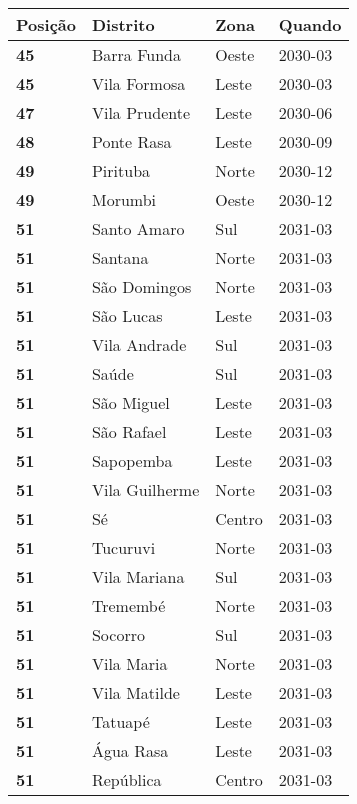 \begin{table}[H]
	\centering
	\begin{tabular}{l|l|l|l}
		\textbf{Posição} & \textbf{Distrito} & \textbf{Zona} & \textbf{Quando} \\ \hline
		\textbf{45} & Barra Funda & Oeste & 2030-03\\ \hline
		\textbf{45} & Vila Formosa & Leste & 2030-03\\ \hline
		\textbf{47} & Vila Prudente & Leste & 2030-06\\ \hline
		\textbf{48} & Ponte Rasa & Leste & 2030-09\\ \hline
		\textbf{49} & Pirituba & Norte & 2030-12\\ \hline
		\textbf{49} & Morumbi & Oeste & 2030-12\\ \hline
		\textbf{51} & Santo Amaro & Sul & 2031-03\\ \hline
		\textbf{51} & Santana & Norte & 2031-03\\ \hline
		\textbf{51} & São Domingos & Norte & 2031-03\\ \hline
		\textbf{51} & São Lucas & Leste & 2031-03\\ \hline
		\textbf{51} & Vila Andrade & Sul & 2031-03\\ \hline
		\textbf{51} & Saúde & Sul & 2031-03\\ \hline
		\textbf{51} & São Miguel & Leste & 2031-03\\ \hline
		\textbf{51} & São Rafael & Leste & 2031-03\\ \hline
		\textbf{51} & Sapopemba & Leste & 2031-03\\ \hline
		\textbf{51} & Vila Guilherme & Norte & 2031-03\\ \hline
		\textbf{51} & Sé & Centro & 2031-03\\ \hline
		\textbf{51} & Tucuruvi & Norte & 2031-03\\ \hline
		\textbf{51} & Vila Mariana & Sul & 2031-03\\ \hline
		\textbf{51} & Tremembé & Norte & 2031-03\\ \hline
		\textbf{51} & Socorro & Sul & 2031-03\\ \hline
		\textbf{51} & Vila Maria & Norte & 2031-03\\ \hline
		\textbf{51} & Vila Matilde & Leste & 2031-03\\ \hline
		\textbf{51} & Tatuapé & Leste & 2031-03\\ \hline
		\textbf{51} & Água Rasa & Leste & 2031-03\\ \hline
		\textbf{51} & República & Centro & 2031-03\\ \hline

\end{tabular}
\end{table}
